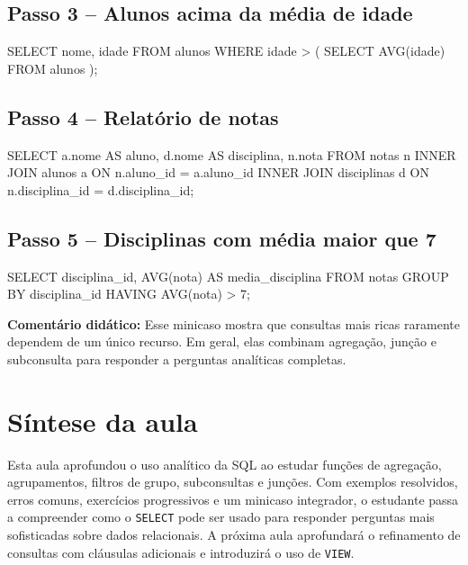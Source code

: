 \subsection*{Passo 3 -- Alunos acima da média de idade}

\begin{sqlcode}
SELECT nome, idade
FROM alunos
WHERE idade > (
    SELECT AVG(idade)
    FROM alunos
);
\end{sqlcode}

\subsection*{Passo 4 -- Relatório de notas}

\begin{sqlcode}
SELECT a.nome AS aluno,
       d.nome AS disciplina,
       n.nota
FROM notas n
INNER JOIN alunos a
    ON n.aluno_id = a.aluno_id
INNER JOIN disciplinas d
    ON n.disciplina_id = d.disciplina_id;
\end{sqlcode}

\subsection*{Passo 5 -- Disciplinas com média maior que 7}

\begin{sqlcode}
SELECT
    disciplina_id,
    AVG(nota) AS media_disciplina
FROM notas
GROUP BY disciplina_id
HAVING AVG(nota) > 7;
\end{sqlcode}

\textbf{Comentário didático:}
Esse minicaso mostra que consultas mais ricas raramente dependem de um único recurso. Em geral, elas combinam agregação, junção e subconsulta para responder a perguntas analíticas completas.

\section{Síntese da aula}

Esta aula aprofundou o uso analítico da SQL ao estudar funções de agregação, agrupamentos, filtros de grupo, subconsultas e junções. Com exemplos resolvidos, erros comuns, exercícios progressivos e um minicaso integrador, o estudante passa a compreender como o \texttt{SELECT} pode ser usado para responder perguntas mais sofisticadas sobre dados relacionais. A próxima aula aprofundará o refinamento de consultas com cláusulas adicionais e introduzirá o uso de \texttt{VIEW}.